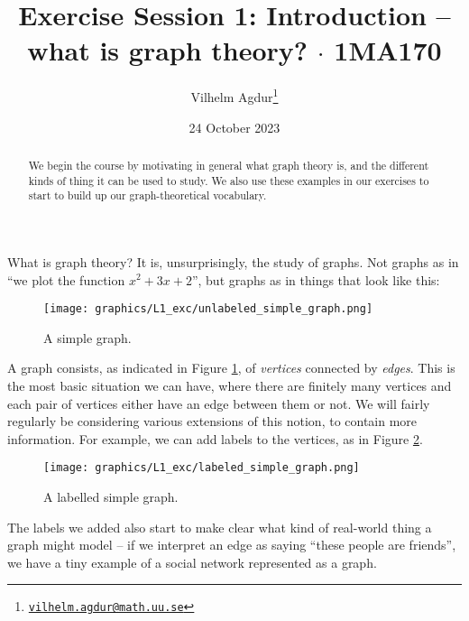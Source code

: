 \documentclass[nobib]{tufte-handout}
\title{Exercise Session 1: Introduction -- what is graph theory? $\cdot$ 1MA170}
\author[Vilhelm Agdur]{Vilhelm Agdur\thanks{\href{mailto:vilhelm.agdur@math.uu.se}{\nolinkurl{vilhelm.agdur@math.uu.se}}}}
\date{24 October 2023}
\begin{document}
\maketitle%

\begin{abstract}
\noindent
We begin the course by motivating in general what graph theory is, and the different kinds of thing it can be used to study. We also use these examples in our exercises to start to build up our graph-theoretical vocabulary.
\end{abstract}

What is graph theory? It is, unsurprisingly, the study of graphs. Not graphs as in ``we plot the function $x^2+3x+2$'', but graphs as in things that look like this:

\begin{figure}
  \centering
  \texttt{[image: graphics/L1\_exc/unlabeled\_simple\_graph.png]}
  \caption{A simple graph.}
  \label{fig:simple_graph}
\end{figure}

A graph consists, as indicated in Figure \ref{fig:simple_graph}, of \emph{vertices} connected by \emph{edges}. This is the most basic situation we can have, where there are finitely many vertices and each pair of vertices either have an edge between them or not. We will fairly regularly be considering various extensions of this notion, to contain more information. For example, we can add labels to the vertices, as in Figure \ref{fig:labelled_simple_graph}.

\begin{figure}
  \centering
  \texttt{[image: graphics/L1\_exc/labeled\_simple\_graph.png]}
  \caption{A labelled simple graph.}
  \label{fig:labelled_simple_graph}
\end{figure}

The labels we added also start to make clear what kind of real-world thing a graph might model -- if we interpret an edge as saying ``these people are friends'', we have a tiny example of a social network represented as a graph.
\end{document}
